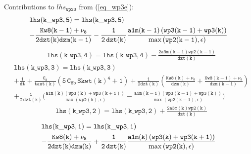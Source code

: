 \documentclass[11pt,fleqn]{article}
\begin{document}
%
Contributions to $lhs_{\mathtt{wp23}}$ from (\ref{eq_wp3e}):
%
\begin{equation}
\begin{split}
& \mathtt{ lhs(k\_wp3,5) = lhs(k\_wp3,5) }\\
& \mathtt{
- \frac{Kw8(k-1)+\nu_8}{2 dzt(k)dzm(k-1)}
- \frac{1}{2 \, dzt(k)}
  \frac{ a1m(k-1)
         \left(wp3(k-1)+wp3(k)\right) }
       { \max\left( wp2(k-1), \epsilon \right) }
}
\end{split}
\end{equation}
%
\begin{equation}
\begin{split}
& \mathtt{ lhs(k\_wp3,4) = lhs(k\_wp3,4) 
  - \frac{2 a3m(k-1) wp2(k-1)}{dzt(k)}
  }
\end{split}
\end{equation}
%
\begin{equation}
\begin{split}
& \mathtt{ lhs(k\_wp3,3) = lhs(k\_wp3,3) }\\
& \mathtt{
+ \frac{1}{dt}
+ \frac{C_8}{taut(k)}
   \left(  5 \, C_{8b} \, {Skwt(k)}^4 + 1 \right)
+ \frac{1}{2 dzt(k)} \left(  \frac{Kw8(k)+\nu_8}{dzm(k)}
                           + \frac{Kw8(k-1)+\nu_8}{dzm(k-1)} \right)
} \\
& \mathtt{
+ \frac{1}{2 \, dzt(k)}
  \bigg(
    \frac{ a1m(k)
           \left(wp3(k)+wp3(k+1)\right) }
         { \max\left( wp2(k), \epsilon \right) }
  - \frac{ a1m(k-1)
           \left(wp3(k-1)+wp3(k)\right) }
         { \max\left( wp2(k-1), \epsilon \right) }
  \bigg)
}
\end{split}
\end{equation}
%
\begin{equation}
\begin{split}
& \mathtt{ lhs(k\_wp3,2) = lhs(k\_wp3,2)
  + \frac{2 a3m(k) wp2(k)}{dzt(k)}
  }
\end{split}
\end{equation}
%
\begin{equation}
\begin{split}
& \mathtt{ lhs(k\_wp3,1) = lhs(k\_wp3,1) }\\
& \mathtt{
- \frac{Kw8(k)+\nu_8}{2 dzt(k)dzm(k)}
+ \frac{1}{2 \, dzt(k)}
  \frac{ a1m(k) \left(wp3(k)+wp3(k+1)\right) }
       { \max\left( wp2(k), \epsilon \right) }
}
\end{split}
\end{equation}
\end{document}
